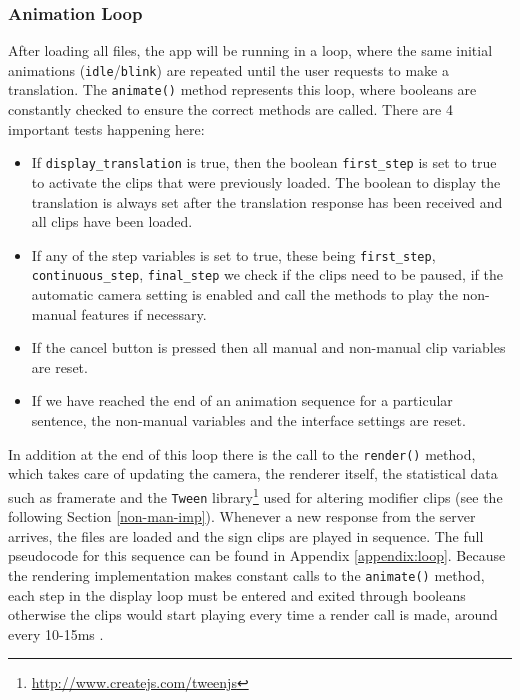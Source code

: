 \documentclass[12pt]{ociamthesis}  %
\newcommand{\tech}{\texttt}
\begin{document}
\subsubsection{Animation Loop}
\label{loop}
After loading all files, the app will be running in a loop, where the same initial animations (\texttt{idle}/\texttt{blink}) are repeated until the user requests to make a translation. The \texttt{animate()} method represents this loop, where booleans are constantly checked to ensure the correct methods are called. There are 4 important tests happening here:
\begin{itemize}
	\item If \texttt{display\_translation} is true, then the boolean \texttt{first\_step} is set to true to activate the clips that were previously loaded. The boolean to display the translation is always set after the translation response has been received and all clips have been loaded.
	\item If any of the step variables is set to true, these being \texttt{first\_step}, \texttt{continuous\_step}, \texttt{final\_step} we check if the clips need to be paused, if the automatic camera setting is enabled and call the methods to play the non-manual features if necessary.
	\item If the cancel button is pressed then all manual and non-manual clip variables are reset.
	\item If we have reached the end of an animation sequence for a particular sentence, the non-manual variables and the interface settings are reset.
\end{itemize}
In addition at the end of this loop there is the call to the \texttt{render()} method, which takes care of updating the camera, the renderer itself, the statistical data such as framerate and the \tech{Tween} library\footnote{\url{http://www.createjs.com/tweenjs}} used for altering modifier clips (see the following Section \ref{non-man-imp}). Whenever a new response from the server arrives, the files are loaded and the sign clips are played in sequence. The full pseudocode for this sequence can be found in Appendix \ref{appendix:loop}. Because the rendering implementation makes constant calls to the \texttt{animate()} method, each step in the display loop must be entered and exited through booleans  otherwise the clips would start playing every time a render call is made, around every 10-15ms .
\end{document}
